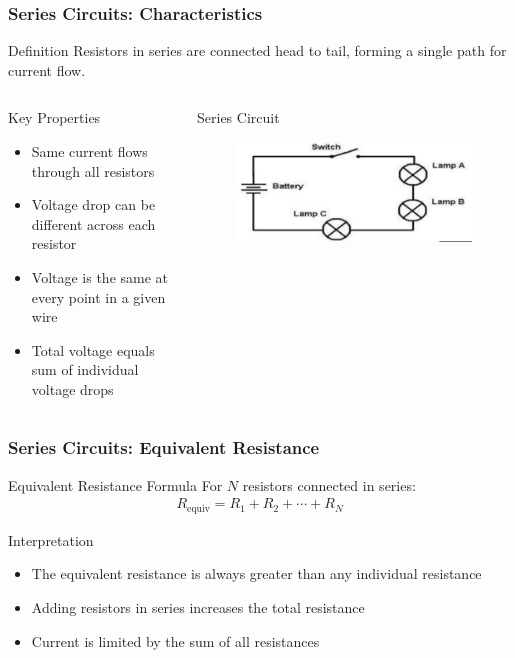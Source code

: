 \documentclass{beamer}
\begin{document}
\begin{frame}
\frametitle{Series Circuits: Characteristics}
\begin{block}{Definition}
Resistors in series are connected head to tail, forming a single path for current flow.
\end{block}

\begin{columns}
\begin{block}{Key Properties}
\begin{itemize}
\item Same current flows through all resistors
\item Voltage drop can be different across each resistor
\item Voltage is the same at every point in a given wire
\item Total voltage equals sum of individual voltage drops
\end{itemize}
\end{block}

\begin{alertblock}{Series Circuit}
\alert{}
\begin{figure}
    \centering
    \includegraphics[width=1\linewidth]{phys11-circuits-series-resistors.png}
\end{figure}
\end{alertblock}
\end{columns}
\end{frame}

\begin{frame}
\frametitle{Series Circuits: Equivalent Resistance}
\begin{block}{Equivalent Resistance Formula}
For $N$ resistors connected in series:
\begin{align}
R_{\text{equiv}} = R_1 + R_2 + \cdots + R_N
\end{align}
\end{block}

\begin{block}{Interpretation}
\begin{itemize}
\item The equivalent resistance is always greater than any individual resistance
\item Adding resistors in series increases the total resistance
\item Current is limited by the sum of all resistances
\end{itemize}
\end{block}


\end{frame}
\end{document}
